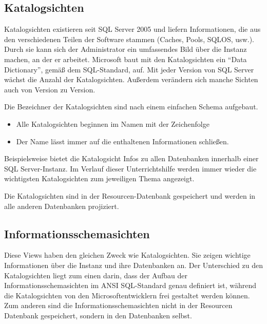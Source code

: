       \subsection{Katalogsichten}
        Katalogsichten existieren seit SQL Server 2005 und liefern         
        Informationen, die aus den verschiedenen Teilen der Software stammen
        (Caches, Pools, SQLOS, usw.). Durch sie kann sich der
        Administrator ein umfassendes Bild über die Instanz machen, an der er
        arbeitet. Microsoft baut mit den Katalogsichten ein \enquote{Data
        Dictionary}, gemäß dem SQL-Standard, auf. Mit jeder Version von SQL
        Server wächst die Anzahl der Katalogsichten. Außerdem verändern sich
        manche Sichten auch von Version zu Version.
        
        Die Bezeichner der Katalogsichten sind nach einem einfachen Schema
        aufgebaut.
        \begin{itemize}
            \item Alle Katalogsichten beginnen im Namen mit der Zeichenfolge
            \item Der Name lässt immer auf die enthaltenen Informationen
            schließen.
        \end{itemize}
        Beispielsweise bietet die Katalogsicht 
        Infos zu allen Datenbanken innerhalb einer SQL Server-Instanz. Im
        Verlauf dieser Unterrichtshilfe werden immer wieder die wichtigsten
        Katalogsichten zum jeweiligen Thema angezeigt.
        
        \begin{merke}
          Die Katalogsichten sind in der Resourcen-Datenbank gespeichert und
          werden in alle anderen Datenbanken projiziert.
        \end{merke}
        
        \begin{literaturinternet}
          \item \cite{ms174365}
        \end{literaturinternet}
      \subsection{Informationsschemasichten}
        Diese Views haben den gleichen Zweck wie Katalogsichten.
        Sie zeigen wichtige Informationen über die Instanz und ihre Datenbanken
        an. Der Unterschied zu den Katalogsichten liegt zum einen darin, dass
        der Aufbau der Informationsschemasichten im ANSI SQL-Standard genau definiert
        ist, während die Katalogsichten von den Microsoftentwicklern frei
        gestaltet werden können. Zum anderen sind die
        Informationsschemasichten nicht in der Resourcen Datenbank
        gespeichert, sondern in den Datenbanken selbst.
        
